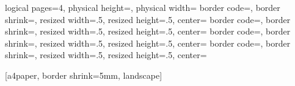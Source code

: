 



  

\renewcommand{\emph}[1]{{\bf \blue{#1}}}

{
  \usepackage{pgf}
  \usepackage{pgfpages}

{
  \edef\pgfpageoptionheight{\the\paperheight} 
  \edef\pgfpageoptionwidth{\the\paperwidth}
  \edef\pgfpageoptionborder{0pt}
}
{
  \pgfpagesphysicalpageoptions
  {%
    logical pages=4,%
    physical height=\pgfpageoptionheight,%
    physical width=\pgfpageoptionwidth%
  }
  {%
    border code=\pgfsetlinewidth{2pt}\pgfstroke,%
    border shrink=\pgfpageoptionborder,%
    resized width=.5\pgfphysicalwidth,%
    resized height=.5\pgfphysicalheight,%
    center=\pgfpoint{.25\pgfphysicalwidth}{.75\pgfphysicalheight}%
  }%
  {%
    border code=\pgfsetlinewidth{2pt}\pgfstroke,%
    border shrink=\pgfpageoptionborder,%
    resized width=.5\pgfphysicalwidth,%
    resized height=.5\pgfphysicalheight,%
    center=\pgfpoint{.75\pgfphysicalwidth}{.75\pgfphysicalheight}%
  }%
  {%
    border code=\pgfsetlinewidth{2pt}\pgfstroke,%
    border shrink=\pgfpageoptionborder,%
    resized width=.5\pgfphysicalwidth,%
    resized height=.5\pgfphysicalheight,%
    center=\pgfpoint{.25\pgfphysicalwidth}{.25\pgfphysicalheight}%
  }%
  {%
    border code=\pgfsetlinewidth{2pt}\pgfstroke,%
    border shrink=\pgfpageoptionborder,%
    resized width=.5\pgfphysicalwidth,%
    resized height=.5\pgfphysicalheight,%
    center=\pgfpoint{.75\pgfphysicalwidth}{.25\pgfphysicalheight}%
  }%
}


  [a4paper, border shrink=5mm, landscape]
  \nofiles
}

